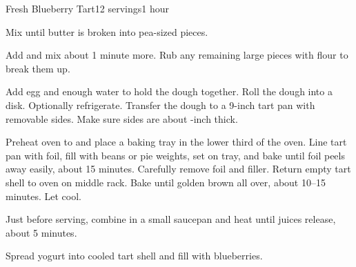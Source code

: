 \documentclass[../Cookbook.tex]{subfiles}
\begin{document}
\begin{recipe}{Fresh Blueberry Tart}{12 servings}{1 hour}

Mix until butter is broken into pea-sized pieces.

Add and mix about 1 minute more. Rub any remaining large pieces with flour to break them up.

Add egg and enough water to hold the dough together. Roll the dough into a disk. Optionally refrigerate.
Transfer the dough to a 9-inch tart pan with removable sides. Make sure sides are about -inch thick.

Preheat oven to  and place a baking tray in the lower third of the oven.
Line tart pan with foil, fill with beans or pie weights, set on tray, and bake until foil peels away easily, about 15 minutes. Carefully remove foil and filler. Return empty tart shell to oven on middle rack. Bake until golden brown all over, about 10--15 minutes. Let cool.

Just before serving, combine in a small saucepan and heat until juices release, about 5 minutes.

Spread yogurt into cooled tart shell and fill with blueberries.

\end{recipe}
\end{document}
